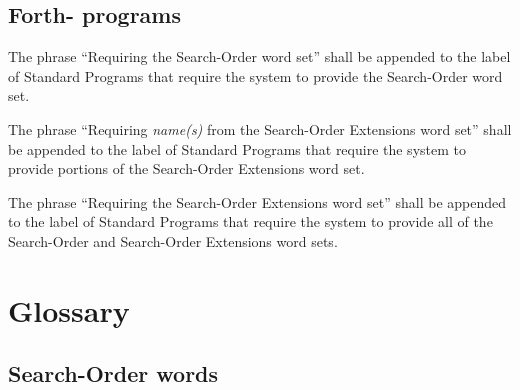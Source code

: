 \cbstart{}
\subsection[Forth-\snapshot programs]{Forth-\snapshot{} programs} %
\cbend

The phrase ``Requiring the Search-Order word set'' shall be appended
to the label of Standard Programs that require the system to provide
the Search-Order word set.

The phrase ``Requiring \emph{name(s)} from the Search-Order
Extensions word set'' shall be appended to the label of Standard
Programs that require the system to provide portions of the
Search-Order Extensions word set.

The phrase ``Requiring the Search-Order Extensions word set'' shall
be appended to the label of Standard Programs that require the system
to provide all of the Search-Order and Search-Order Extensions word
sets.


\section{Glossary} %

\subsection{Search-Order words} %

